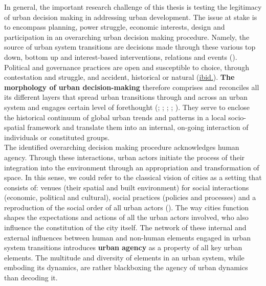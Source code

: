 \documentclass[11pt]{report}
\begin{document}
{{In general, the important research challenge of this thesis is testing the legitimacy of urban decision making in addressing urban development. The issue at stake is to encompass planning, power struggle, economic interests, design and participation in an overarching urban decision making procedure. Namely, the source of urban system transitions are decisions made through these various top down, bottom up and interest-based interventions, relations and events (\citealt{hudson_political_2014}).
Political and governance practices are open and susceptible to choice, through contestation and struggle, and accident, historical or natural (\href{ref}{ibid.}).
\textbf{The morphology of urban decision-making} therefore comprises and reconciles all its different layers that spread urban transitions through and across an urban system and engages certain level of forethought ({\citealt{healey_collaborative_1997}}; \href{ref}{\citealt{scott_seeing_1998}}; \href{ref}{\citealt{pierre_debating_2000}}; \href{ref}{\citealt{pierre_governance_2000}}; \href{ref}{\citealt{hudson_political_2014}}). They serve to enclose the historical continuum of global urban trends and patterns in a local socio-spatial framework and translate them into an internal, on-going interaction of individuals or constituted groups.
\\

The identified overarching decision making procedure acknowledges human agency. Through these interactions, urban actors initiate the process of their integration into the environment through an appropriation and transformation of space. In this sense, we could refer to the classical vision of cities as a setting that consists of: venues (their spatial and built environment) for social interactions (economic, political and cultural), social practices (policies and processes) and a reproduction of the social order of all urban actors (\citealt{firmino_pervasive_2008}). The way cities function shapes the expectations and actions of all the urban actors involved, who also influence the constitution of the city itself. The network of these internal and external influences between human and non-human elements engaged in urban system transitions introduces \textbf{urban agency} as a property of all key urban elements. The multitude and diversity of elements in an urban system, while emboding its dynamics, are rather blackboxing the agency of urban dynamics than decoding it.
\\

}}
\end{document}
